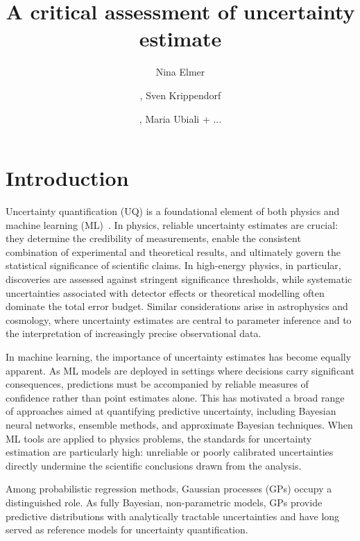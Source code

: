 \documentclass[11pt,a4paper]{article}
\title{A critical assessment of uncertainty estimate}
\author[a]{Nina Elmer}
\author[a]{, Sven Krippendorf}
\author[a]{, Maria Ubiali + ...}
\affiliation[a]{DAMTP, University of Cambridge, Wilberforce Road, Cambridge, CB3 0WA, United Kingdom}
\begin{document}
\maketitle
\flushbottom

\section{Introduction}

Uncertainty quantification (UQ) is a foundational element of both physics and machine learning (ML)~\cite{MLgenUQ1,MLgenUQ2,MLgenU3,PHYgenUQ1,Chen:2022pzc}.
In physics, reliable uncertainty estimates are crucial: they determine the credibility of measurements, enable the consistent combination of experimental 
and theoretical results, and ultimately govern the statistical significance of scientific claims. In high-energy physics, in particular, discoveries 
are assessed against stringent significance thresholds, while systematic uncertainties associated with detector effects or theoretical modelling often 
dominate the total error budget. Similar considerations arise in astrophysics and cosmology, where uncertainty estimates are central to parameter 
inference and to the interpretation of increasingly precise observational data.

In machine learning, the importance of uncertainty estimates has become equally apparent. As ML models are deployed in settings where 
decisions carry significant consequences, predictions must be accompanied by reliable measures of confidence rather than point estimates alone. 
This has motivated a broad range of approaches aimed at quantifying predictive uncertainty, including Bayesian neural networks, ensemble methods, 
and approximate Bayesian techniques. When ML tools are applied to physics problems, the standards for uncertainty estimation are particularly high: 
unreliable or poorly calibrated uncertainties directly undermine the scientific conclusions drawn from the analysis.

Among probabilistic regression methods, Gaussian processes (GPs) occupy a distinguished role. As fully Bayesian, non-parametric models, GPs 
provide predictive distributions with analytically tractable uncertainties and have long served as reference models for uncertainty quantification. 
\end{document}
